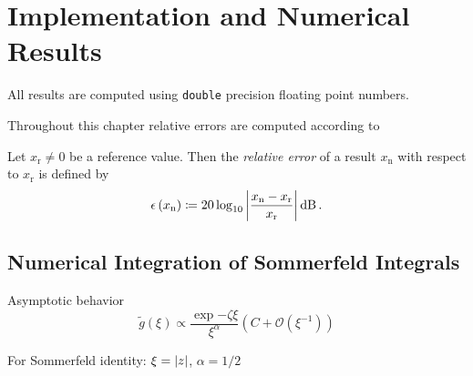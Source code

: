 \chapter{Implementation and Numerical Results}

All results are computed using \texttt{double} precision floating point numbers.

Throughout this chapter relative errors are computed according to
\begin{definition}
    Let $x_\mathrm{r} \neq 0$ be a reference value.
    Then the \emph{relative error} of a result $x_\mathrm{n}$ with respect to
    $x_\mathrm{r}$ is defined by 
    \begin{equation}
        \epsilon \left( x_\mathrm{n} \right) \coloneqq
        20 \log_{10} \abs{\frac{x_\mathrm{n} - x_\mathrm{r}}{x_\mathrm{r}}}
        \SI{}{\decibel}\, .
    \end{equation}
\end{definition}

\section{Numerical Integration of Sommerfeld Integrals}

\cite{Michalski2016a}

Asymptotic behavior \cite{Michalski1998}
\begin{equation}
    \tilde{g}\left(\xi\right)
    \propto \frac{\exp{-\zeta \xi}}{\xi^\alpha}
    \left(C + \mathcal{O}\left(\xi^{-1}\right)\right)
\end{equation}

For Sommerfeld identity: $\xi = \left\vert z\right\vert$, $\alpha = 1/2$

